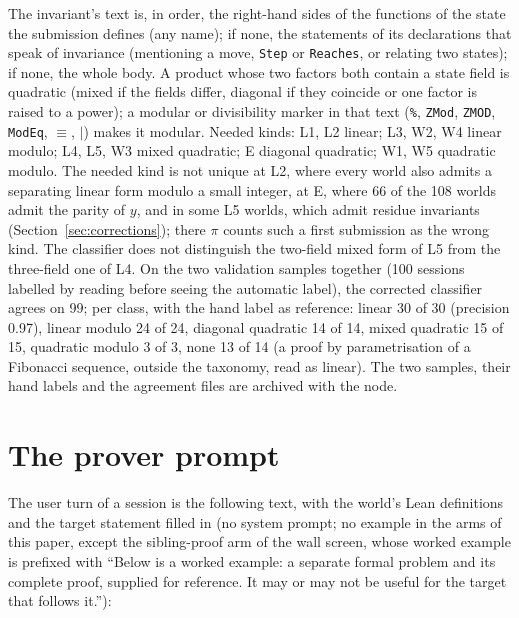 \documentclass[11pt]{article}
\begin{document}
The invariant's text is, in order, the right-hand sides of the functions
of the state the submission defines (any name); if none, the statements of
its declarations that speak of invariance (mentioning a move, \texttt{Step}
or \texttt{Reaches}, or relating two states); if none, the whole body. A
product whose two factors both contain a state field is quadratic (mixed
if the fields differ, diagonal if they coincide or one factor is raised to
a power); a modular or divisibility marker in that text (\texttt{\%},
\texttt{ZMod}, \texttt{ZMOD}, \texttt{ModEq}, $\equiv$, $\mid$) makes it
modular. Needed kinds: L1, L2 linear; L3, W2, W4 linear modulo; L4, L5, W3
mixed quadratic; E diagonal quadratic; W1, W5 quadratic modulo. The
needed kind is not unique at L2, where every world also admits a
separating linear form modulo a small integer, at E, where 66 of the 108
worlds admit the parity of $y$, and in some L5 worlds, which admit residue
invariants (Section~\ref{sec:corrections}); there $\pi$ counts such a first
submission as the wrong kind. The classifier does not distinguish the two-field mixed form of L5 from the
three-field one of L4. On the two validation samples together (100
sessions labelled by reading before seeing the automatic label), the
corrected classifier agrees on 99; per class, with the hand label as
reference: linear 30 of 30 (precision 0.97), linear modulo 24 of 24,
diagonal quadratic 14 of 14, mixed quadratic 15 of 15, quadratic modulo 3
of 3, none 13 of 14 (a proof by parametrisation of a Fibonacci sequence,
outside the taxonomy, read as linear). The two samples, their hand labels
and the agreement files are archived with the node.

\section{The prover prompt}
\label{app:prompt}

The user turn of a session is the following text, with the world's Lean
definitions and the target statement filled in (no system prompt; no
example in the arms of this paper, except the sibling-proof arm of the
wall screen, whose worked example is prefixed with ``Below is a worked
example: a separate formal problem and its complete proof, supplied for
reference. It may or may not be useful for the target that follows it.''):
\end{document}
